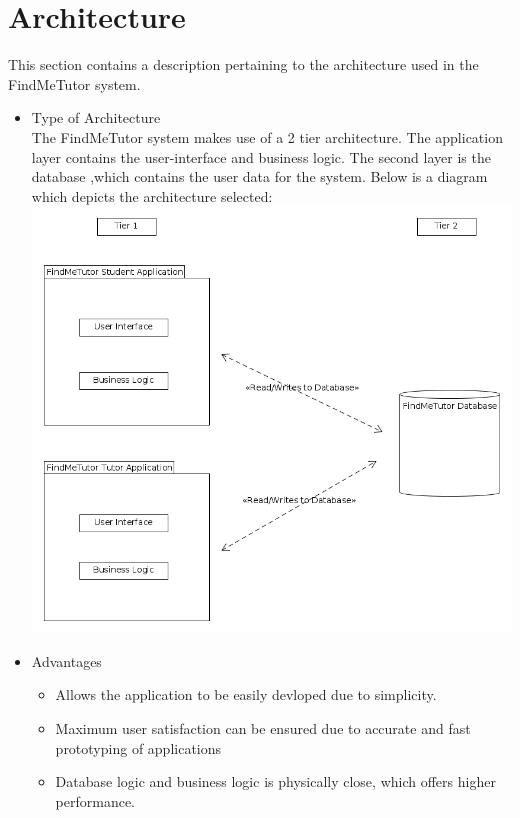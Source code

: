 \documentclass[12pt]{article}
\begin{document}

\section{Architecture}
This section contains a description pertaining to the architecture used in the FindMeTutor system.

\begin{itemize}
\item Type of Architecture\\
The FindMeTutor system makes use of a 2 tier architecture. The application layer contains the user-interface and business logic. The second layer is the database ,which contains the user data for the system. Below is a diagram which depicts the architecture selected:\\
\includegraphics[width=140mm]{./2_Tier_Diagram.png}\\

\item Advantages
\begin{itemize}
\item Allows the application to be easily devloped due to simplicity.
\item Maximum user satisfaction can be ensured due to accurate and fast prototyping of applications
\item Database logic and business logic is physically close, which offers higher performance.\\
\end{itemize}


\end{itemize}
\end{document}
